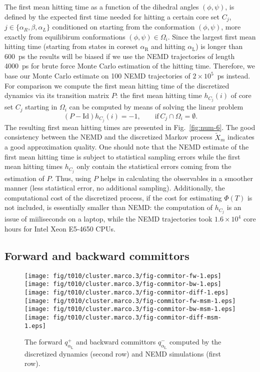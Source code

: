 \documentclass[aps, pre, preprint,unsortedaddress,a4paper,onecolumn]{revtex4}
\newcommand{\vect}[1]{#1}
\newcommand{\fwd}[0]{+}
\newcommand{\bwd}[0]{-}
\newcommand{\id}{\mathrm{Id}}
\newcommand{\confaa}[0]{{\alpha_{\textrm{R}}}}
\newcommand{\confc}[0]{{\alpha_{\textrm{L}}}}
\begin{document}
The first mean hitting time as a function of the dihedral angles $(\phi,\psi)$,
is defined by the expected first time needed for hitting a certain core set $C_j$,
$j\in\{\alpha_R,\beta,\alpha_L\}$ conditioned on starting from the
conformation $(\phi,\psi)$, more exactly from equilibirum conformations $(\phi,\psi)\in\Omega_i$.  Since the largest first mean hitting
time (starting from states in coreset $\confaa$ and hitting $\confc$) is longer than
600~ps the results will be biased if we use the NEMD trajectories of length 4000~ps for brute force Monte Carlo estimation of the hitting time. 
Therefore, we base our Monte Carlo estimate on 100 NEMD
trajectories of $2\times 10^5$~ps instead. For comparison we compute the first mean hitting
time of the discretized dynamics via its transition matrix $\vect P$: the first mean hitting time $h_{C_j}(i)$ of core set $C_j$ starting in $\Omega_i$ can  be computed by means of solving the linear problem \cite{A19-31}
\[
(\vect P-\id) h_{C_j}(i) = -1,\qquad \mathrm{if} \, C_j\cap \Omega_i=\emptyset.
\] 
The resulting first mean hitting times are presented in Fig.~\ref{fig:num-6}.  The
good consistency between the NEMD and the discretized Markov process
$\tilde X_{m}$ indicates a good approximation quality.
One should note that the NEMD estimate of the first mean hitting time is subject to statistical sampling errors while the first mean hitting times $h_{C_j}$ only contain the statistical errors coming from the estimation of $\vect P$. 
Thus, using $P$ helps in calculating the observables
in a smoother  manner (less statistical error, no additional sampling).
Additionally, the computational cost of the
discretized process, if the cost for estimating $\Phi(T)$ is not included, is
essentially smaller than NEMD:
the computation of $h_{C_j}$ is an issue of miiliseconds on a laptop, while the
NEMD trajectories took $1.6\times 10^4$ core hours for Intel Xeon E5-4650 CPUs.


\subsection{Forward and backward committors}
\label{sec:alanine-committor}
\begin{figure}
  \centering
  \texttt{[image: fig/t010/cluster.marco.3/fig-commitor-fw-1.eps]}
  \texttt{[image: fig/t010/cluster.marco.3/fig-commitor-bw-1.eps]}
  \texttt{[image: fig/t010/cluster.marco.3/fig-commitor-diff-1.eps]}\\
  \texttt{[image: fig/t010/cluster.marco.3/fig-commitor-fw-msm-1.eps]}
  \texttt{[image: fig/t010/cluster.marco.3/fig-commitor-bw-msm-1.eps]}
  \texttt{[image: fig/t010/cluster.marco.3/fig-commitor-diff-msm-1.eps]}
  \caption{The forward $q^\fwd_{\confc}$ and backward committors
    $q^\bwd_{\confc}$ computed by the discretized dynamics (second row) and NEMD simulations (first
    row).}
  \label{fig:num-3}
\end{figure}
\end{document}
